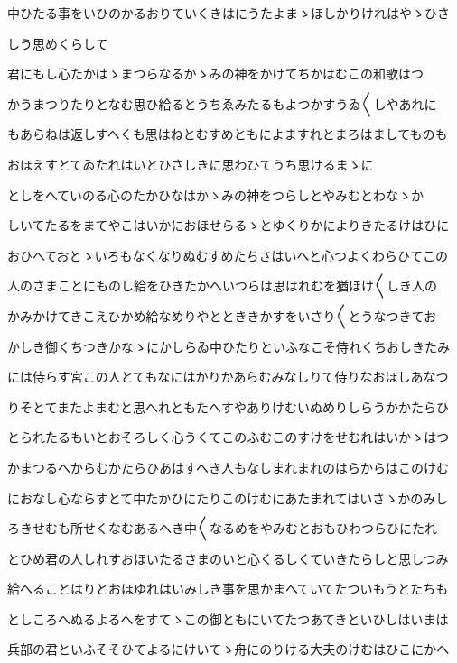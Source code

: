 \documentclass[a4paper,11pt,landscape]{ltjtarticle}
\begin{document}
中ひたる事をいひのかるおりていくきはにうたよまゝほしかりけれはやゝひさ
\par\medskip
しう思めくらして
\par\medskip
君にもし心たかはゝまつらなるかゝみの神をかけてちかはむこの和歌はつ
\par\medskip
かうまつりたりとなむ思ひ給るとうちゑみたるもよつかすうゐ〱しやあれに
\par\medskip
もあらねは返しすへくも思はねとむすめともによますれとまろはましてものも
\par\medskip
おほえすとてゐたれはいとひさしきに思わひてうち思けるまゝに
\par\medskip
としをへていのる心のたかひなはかゝみの神をつらしとやみむとわなゝか
\par\medskip
しいてたるをまてやこはいかにおほせらるゝとゆくりかによりきたるけはひに
\par\medskip
おひへておとゝいろもなくなりぬむすめたちさはいへと心つよくわらひてこの
\par\medskip
人のさまことにものし給をひきたかへいつらは思はれむを猶ほけ〱しき人の
\par\medskip
かみかけてきこえひかめ給なめりやととききかすをいさり〱とうなつきてお
\par\medskip
かしき御くちつきかなゝにかしらゐ中ひたりといふなこそ侍れくちおしきたみ
\par\medskip
には侍らす宮この人とてもなにはかりかあらむみなしりて侍りなおほしあなつ
\par\medskip
りそとてまたよまむと思へれともたへすやありけむいぬめりしらうかかたらひ
\par\medskip
とられたるもいとおそろしく心うくてこのふむこのすけをせむれはいかゝはつ
\par\medskip
かまつるへからむかたらひあはすへき人もなしまれまれのはらからはこのけむ
\par\medskip
におなし心ならすとて中たかひにたりこのけむにあたまれてはいさゝかのみし
\par\medskip
ろきせむも所せくなむあるへき中〱なるめをやみむとおもひわつらひにたれ
\par\medskip
とひめ君の人しれすおほいたるさまのいと心くるしくていきたらしと思しつみ
\par\medskip
給へることはりとおほゆれはいみしき事を思かまへていてたついもうとたちも
\par\medskip
としころへぬるよるへをすてゝこの御ともにいてたつあてきといひしはいまは
\par\medskip
兵部の君といふそそひてよるにけいてゝ舟にのりける大夫のけむはひこにかへ
\par\medskip
\end{document}
